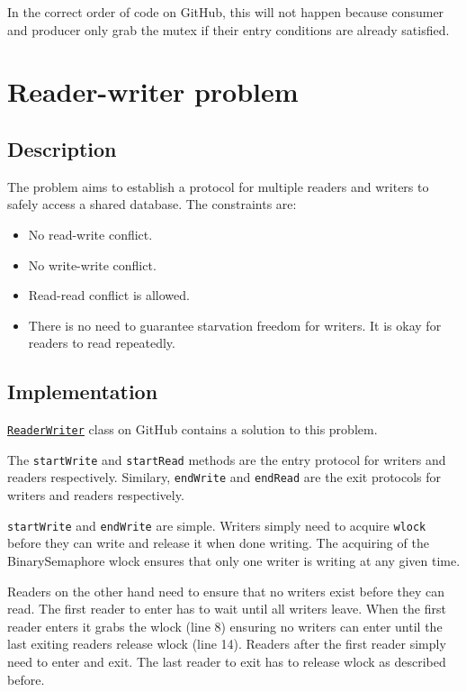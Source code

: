 \documentclass[twoside]{article}
\begin{document}
In the correct order of code on GitHub, this will not happen because consumer and producer only grab the mutex if their entry conditions are already satisfied.

\section{Reader-writer problem}

\subsection{Description}

The problem aims to establish a protocol for multiple readers and writers to safely access a shared database. The constraints are:

\begin{itemize}
    \item No read-write conflict.
    \item No write-write conflict.
    \item Read-read conflict is allowed.
    \item There is no need to guarantee starvation freedom for writers. It is okay for readers to read repeatedly.
\end{itemize}

\subsection{Implementation}

\href{https://github.com/vijaygarg1/UT-Garg-EE382C-EE361C-Multicore/blob/master/chapter3-synchronization_primitives/ReaderWriter.java}{{\tt ReaderWriter}} class on GitHub contains a solution to this problem.

The {\tt startWrite} and {\tt startRead} methods are the entry protocol for writers and readers respectively. Similary, {\tt endWrite} and {\tt endRead} are the exit protocols for writers and readers respectively.

{\tt startWrite} and {\tt endWrite} are simple. Writers simply need to acquire {\tt wlock} before they can write and release it when done writing. The acquiring of the BinarySemaphore wlock ensures that only one writer is writing at any given time.

Readers on the other hand need to ensure that no writers exist before they can read. The first reader to enter has to wait until all writers leave. When the first reader enters it grabs the wlock (line 8) ensuring no writers can enter until the last exiting readers release wlock (line 14). Readers after the first reader simply need to enter and exit. The last reader to exit has to release wlock as described before.
\end{document}

